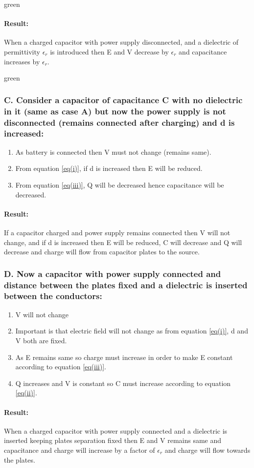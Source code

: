 \begin{mybox}{green}{}
  \paragraph{Result:}
  When a charged capacitor with power supply disconnected,
  and a dielectric of permittivity $\epsilon_{r}$ is introduced
  then E and V decrease by $\epsilon_{r}$ and capacitance increases by $\epsilon_{r}$.
\end{mybox}
\begin{mybox}{green}{}
\subsubsection*{C. Consider a capacitor of capacitance C with no dielectric
in it (same as case A) but now the power supply is
not disconnected (remains connected after charging) and d is increased:}
\begin{enumerate}[label = $\square$]
  \item As battery is connected then V must not change (remains same).
  \item From equation \ref{eq(i)}, if d is increased then E will be reduced. 
  \item From equation \ref{eq(iii)}, Q will be decreased hence 
  capacitance will be decreased. 
\end{enumerate}
\paragraph{Result:}
If a capacitor charged and power supply remains connected then V
will not change, and if d is increased then E will be reduced,
C will decrease and Q will decrease
and charge will flow from capacitor plates to the source.

\subsubsection*{D. Now a capacitor with power supply connected and
distance between the plates fixed and a dielectric is inserted
between the conductors:}
\begin{enumerate}[label = $\square$]
\item V will not change 
\item	Important is that electric field will not change as from equation
\ref{eq(i)}, d and V both are fixed.
\item	As E remains same so charge must increase in order
to make E constant according to equation \ref{eq(iii)}.
\item	Q increases and V is constant so C must increase according to
equation \ref{eq(ii)}.
\end{enumerate}
\paragraph{Result:}
When a charged capacitor with power supply connected and a
dielectric is inserted keeping plates separation fixed then E
and V remains same and capacitance and charge will increase
by a factor of $\epsilon_{r}$ and charge will flow towards the plates.  
\end{mybox}